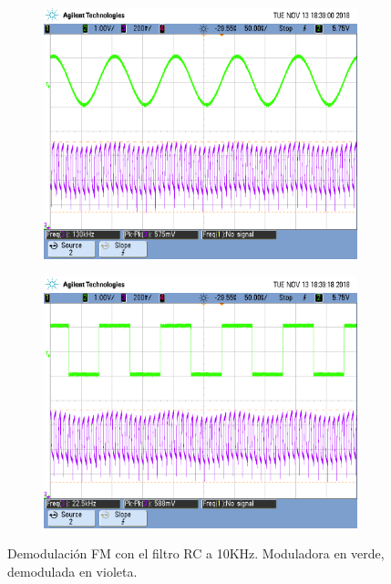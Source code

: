 \documentclass[../../tc_tp6_main.tex]{subfiles}
\begin{document}
\begin{figure}[H]	%
	\centering
	\begin{subfigure}[t]{0.45\textwidth}
		\centering
		\includegraphics[width=\textwidth]{figures/scope_31.png}
		\caption{}
	\end{subfigure}%
	\hfill%
	\begin{subfigure}[t]{0.45\textwidth}
		\centering
		\includegraphics[width=\textwidth]{figures/scope_32.png}
		\caption{}
	\end{subfigure}
	\caption{Demodulaci\'on FM con el filtro RC a 10KHz. Moduladora en verde, demodulada en violeta.}
	\label{fig:fm_rc_10k}
\end{figure}
\end{document}
